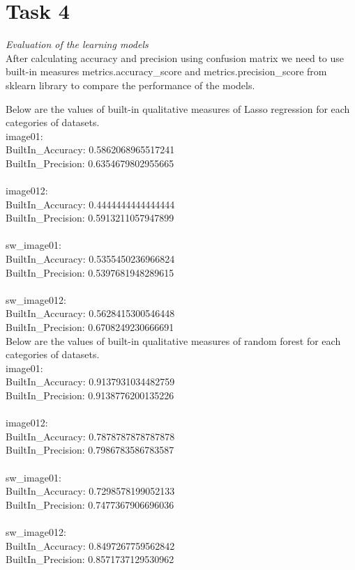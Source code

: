 \documentclass[conference,12pt]{IEEEtran}
\begin{document}
\section{Task 4}
\textit{Evaluation of the learning models}\\

After calculating accuracy and precision using confusion matrix we need to use built-in measures metrics.accuracy\_score and metrics.precision\_score from sklearn library to compare the performance of the models.

Below are the values of built-in  qualitative measures of Lasso regression for each categories of datasets.
\\
image01:\\
BuiltIn\_Accuracy: 0.5862068965517241\\
BuiltIn\_Precision: 0.6354679802955665\\
\\
image012:\\
BuiltIn\_Accuracy: 0.4444444444444444\\
BuiltIn\_Precision: 0.5913211057947899\\
\\
sw\_image01:\\
BuiltIn\_Accuracy: 0.5355450236966824\\
BuiltIn\_Precision: 0.5397681948289615\\
\\
sw\_image012:\\
BuiltIn\_Accuracy: 0.5628415300546448\\
BuiltIn\_Precision: 0.6708249230666691\\

Below are the values of built-in  qualitative measures of random forest for each categories of datasets.
\\
image01:\\
BuiltIn\_Accuracy: 0.9137931034482759\\
BuiltIn\_Precision: 0.9138776200135226\\
\\
image012:\\
BuiltIn\_Accuracy: 0.7878787878787878\\
BuiltIn\_Precision: 0.7986783586783587\\
\\
sw\_image01:\\
BuiltIn\_Accuracy: 0.7298578199052133\\
BuiltIn\_Precision: 0.7477367906696036\\
\\
sw\_image012:\\
BuiltIn\_Accuracy: 0.8497267759562842\\
BuiltIn\_Precision: 0.8571737129530962\\
\end{document}
